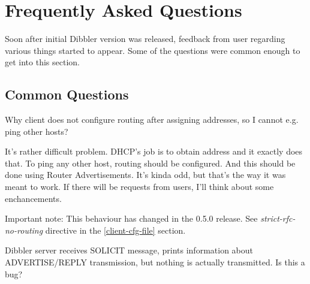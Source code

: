 

\section{Frequently Asked Questions}

Soon after initial Dibbler version was released, feedback from user
regarding various things started to appear. Some of the questions were
common enough to get into this section.

\subsection{Common Questions}

\Q Why client does not configure routing after assigning addresses, so
I cannot e.g. ping other hosts?

\A It's rather difficult problem. DHCP's job is to obtain address and
it exactly does that. To ping any other host, routing should be 
configured. And this should be done using Router Advertisements. It's
kinda odd, but that's the way it was meant to work. If there will be
requests from users, I'll think about some enchancements.

Important note: This behaviour has changed in the 0.5.0 release. See
\emph{strict-rfc-no-routing} directive in the \ref{client-cfg-file}
section. 

\Q Dibbler server receives SOLICIT message, prints information about
ADVERTISE/REPLY transmission, but nothing is actually transmitted. Is
this a bug?

